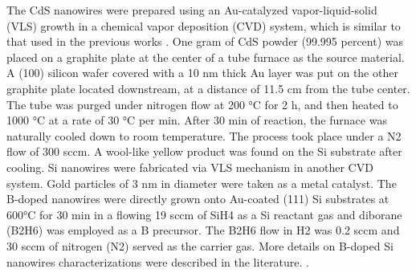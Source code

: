 The CdS nanowires were prepared using an Au-catalyzed vapor-liquid-solid (VLS) growth  in a chemical vapor deposition (CVD) system, which is similar to that used in the previous works \cite{zhang2014photosensing,577926461}. One gram of CdS powder (99.995 percent) was placed on a graphite plate at the center of a tube furnace as the source material. A (100) silicon wafer covered with a 10 nm thick Au layer was put on the other graphite plate located downstream, at a distance of 11.5 cm from the tube center. The tube was purged under nitrogen flow at 200 °C for 2 h, and then heated to 1000 °C at a rate of 30 °C per min. After 30 min of reaction, the furnace was naturally cooled down to room temperature. The process took place under a N2 flow of 300 sccm. A wool-like yellow product was found on the Si substrate after cooling. 
Si nanowires were fabricated via VLS mechanism in another CVD system. Gold particles of 3 nm in diameter were taken as a metal catalyst. The B-doped nanowires were directly grown onto Au-coated (111) Si substrates at 600°C for 30 min in a flowing 19 sccm of SiH4 as a Si reactant gas and diborane (B2H6) was employed as a B precursor. The B2H6 flow in H2 was 0.2 sccm and 30 sccm of nitrogen (N2) served as the carrier gas. More details on B-doped Si nanowires characterizations were described in the literature. \cite{577926462,577926464,577926465}.

